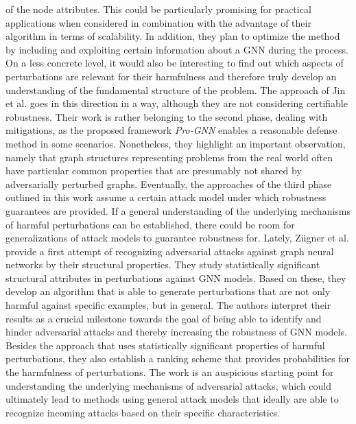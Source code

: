 \documentclass[a4paper,preprint]{sig-alternate}
\begin{document}
of the node attributes. This could be particularly promising for practical applications when considered in combination with the
advantage of their algorithm in terms of scalability.
In addition, they plan to optimize the method by including and exploiting certain information about a GNN during the process.\newline
On a less concrete level, it would also be interesting to find out which aspects of perturbations are relevant for their harmfulness \cite{Zuegner_2020_Patterns}
and therefore truly develop an understanding of the fundamental structure of the problem.
The approach of Jin et al. \cite{Jin_2020_Graph} goes in this direction in a way, although they are not considering certifiable robustness.
Their work is rather belonging to the second phase, dealing with mitigations, as the proposed framework
\textit{Pro-GNN} enables a reasonable defense method in some scenarios.
Nonetheless, they highlight an important observation, namely that graph structures representing problems from the real world often
have particular common properties that are presumably not shared by adversarially perturbed graphs.
Eventually, the approaches of the third phase outlined in this work assume a certain attack model under which robustness guarantees are provided.
If a general understanding of the underlying mechanisms of harmful perturbations can be established, there could be
room for generalizations of attack models to guarantee robustness for.\newline
Lately, Zügner et al. \cite{Zuegner_2020_Patterns} provide a first attempt of recognizing adversarial attacks against graph neural networks
by their structural properties. They study statistically significant structural attributes in perturbations against GNN models.
Based on these, they develop an algorithm that is able to generate perturbations that are not only harmful against specific examples,
but in general. The authors interpret their results as a crucial milestone towards the goal of being able to identify and
hinder adversarial attacks and thereby increasing the robustness of GNN models.
Besides the approach that uses statistically significant properties of harmful perturbations, they also establish a ranking scheme
that provides probabilities for the harmfulness of perturbations. The work is an auspicious starting point for understanding 
the underlying mechanisms of adversarial attacks, which could ultimately lead to methods using general attack models 
that ideally are able to recognize incoming attacks based on their specific characteristics.

\vfill
\pagebreak



\end{document}
